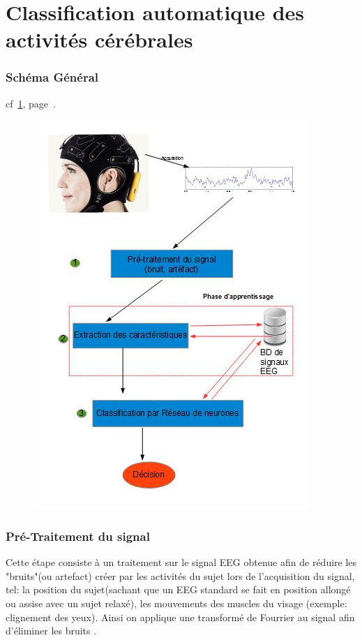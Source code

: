 \part{Classification automatique des activités cérébrales} %
\label{prt:classification_ _automatique_ _des_ _activités_ _cérébrales_}
	\section{Schéma Général} %
	cf~\ref{fig_orga}, page~\pageref{fig_orga}.
		\label{sec:schéma_générale}
		\begin{figure}[t]
			\centering
			    \includegraphics{../organigramme/orga.jpg} \\
				\label{fig_orga}
			\end{figure}

	\section{Pré-Traitement du signal} %
	\label{sec:pré_traitement_du_signal}
Cette étape consiste à un traitement sur le signal EEG obtenue afin de réduire les "bruits"(ou artefact) créer par les activités du sujet lors de l’acquisition du signal, tel: la position du sujet(sachant que un EEG standard se fait en position allongé ou assise avec un sujet relaxé), les mouvements des muscles du visage (exemple: clignement des yeux). Ainsi on applique une transformé de Fourrier au signal afin d'éliminer les bruits .
	
